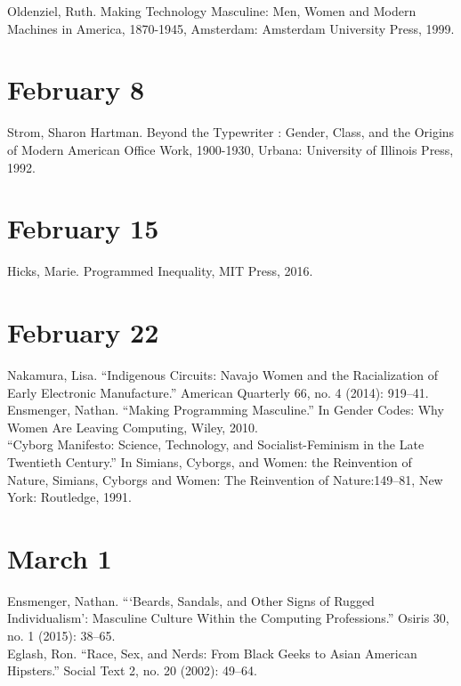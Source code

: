 \documentclass[11pt]{article}
\begin{document}
Oldenziel, Ruth. Making Technology Masculine: Men, Women and Modern Machines in America, 1870-1945, Amsterdam: Amsterdam University Press, 1999.


\section{February 8}

Strom, Sharon Hartman. Beyond the Typewriter : Gender, Class, and the Origins of Modern American Office Work, 1900-1930, Urbana: University of Illinois Press, 1992.


\section{February 15}

Hicks, Marie. Programmed Inequality, MIT Press, 2016.


\section{February 22}

Nakamura, Lisa. “Indigenous Circuits: Navajo Women and the Racialization of Early Electronic Manufacture.” American Quarterly 66, no. 4 (2014): 919–41.\\ 

Ensmenger, Nathan. “Making Programming Masculine.” In Gender Codes: Why Women Are Leaving Computing, Wiley, 2010.\\

“Cyborg Manifesto: Science, Technology, and Socialist-Feminism in the Late Twentieth Century.” In Simians, Cyborgs, and Women: the Reinvention of Nature, Simians, Cyborgs and Women: The Reinvention of Nature:149–81, New York: Routledge, 1991.




\section{March 1}



Ensmenger, Nathan. “‘Beards, Sandals, and Other Signs of Rugged Individualism’: Masculine Culture Within the Computing Professions.” Osiris 30, no. 1 (2015): 38–65.\\

Eglash, Ron. “Race, Sex, and Nerds: From Black Geeks to Asian American Hipsters.” Social Text 2, no. 20 (2002): 49–64.\\
\end{document}
